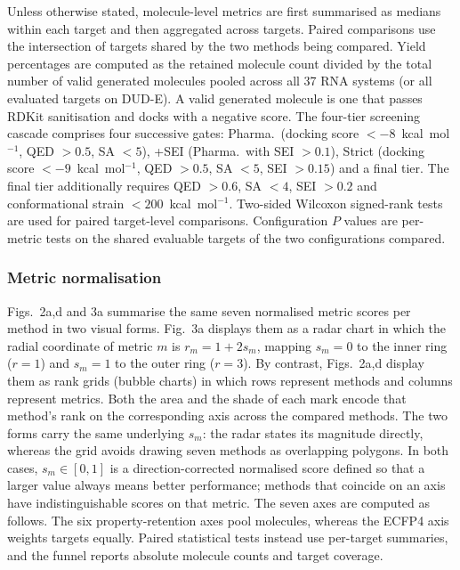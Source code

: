 \documentclass[pdflatex,sn-mathphys-num]{sn-jnl}
\theoremstyle{thmstyleone}
\theoremstyle{thmstyletwo}
\theoremstyle{thmstylethree}
\begin{document}
Unless otherwise stated, molecule-level metrics are first summarised as medians within each target and then aggregated across targets. Paired comparisons use the intersection of targets shared by the two methods being compared. Yield percentages are computed as the retained molecule count divided by the total number of valid generated molecules pooled across all 37 RNA systems (or all evaluated targets on DUD-E). A valid generated molecule is one that passes RDKit sanitisation and docks with a negative score. The four-tier screening cascade comprises four successive gates: Pharma.\ (docking score $<-8$~kcal~mol$^{-1}$, QED $>0.5$, SA $<5$), +SEI (Pharma.\ with SEI $>0.1$), Strict (docking score $<-9$~kcal~mol$^{-1}$, QED $>0.5$, SA $<5$, SEI $>0.15$) and a final tier. The final tier additionally requires QED $>0.6$, SA $<4$, SEI $>0.2$ and conformational strain $<200$~kcal~mol$^{-1}$. Two-sided Wilcoxon signed-rank tests are used for paired target-level comparisons. Configuration $P$ values are per-metric tests on the shared evaluable targets of the two configurations compared.

\subsubsection{Metric normalisation}

Figs.~2a,d and 3a summarise the same seven normalised metric scores per method in two visual forms. Fig.~3a displays them as a radar chart in which the radial coordinate of metric $m$ is $r_m = 1 + 2 s_m$, mapping $s_m=0$ to the inner ring ($r=1$) and $s_m=1$ to the outer ring ($r=3$). By contrast, Figs.~2a,d display them as rank grids (bubble charts) in which rows represent methods and columns represent metrics. Both the area and the shade of each mark encode that method's rank on the corresponding axis across the compared methods. The two forms carry the same underlying $s_m$: the radar states its magnitude directly, whereas the grid avoids drawing seven methods as overlapping polygons. In both cases, $s_m \in [0,1]$ is a direction-corrected normalised score defined so that a larger value always means better performance; methods that coincide on an axis have indistinguishable scores on that metric. The seven axes are computed as follows. The six property-retention axes pool molecules, whereas the ECFP4 axis weights targets equally. Paired statistical tests instead use per-target summaries, and the funnel reports absolute molecule counts and target coverage.
\end{document}
